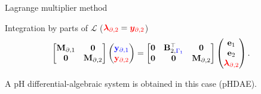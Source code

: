 \documentclass[aspectratio=169]{ISAE-Beamer}
\begin{document}
\begin{frame}{Lagrange multiplier method}
{\begin{block}{Integration by parts of $\mathcal{L}$ ($\textcolor{red}{\bm{\lambda}_{\partial, 2}} = \textcolor{red}{\bm{y}_{\partial, 2}}$)}
\begin{equation*}
\begin{aligned}
					\begin{bmatrix}
						\mathbf{M}_{\partial, 1} & \mathbf{0} \\
						\mathbf{0} & \mathbf{M}_{\partial, 2} \\
					\end{bmatrix}
					\begin{pmatrix}
						\textcolor{blue}{\mathbf{y}_{\partial, 1}} \\
						\textcolor{red}{\mathbf{y}_{\partial, 2}} \\
					\end{pmatrix}
					&= \begin{bmatrix}
						\mathbf{0} & \mathbf{B}_{2, \textcolor{blue}{\Gamma_1}}^\top & \mathbf{0} \\
						\mathbf{0} & \mathbf{0} & \mathbf{M}_{\partial, 2} \\
					\end{bmatrix}\begin{pmatrix}
						\mathbf{e}_{1} \\
						\mathbf{e}_{2} \\
						\textcolor{red}{\bm{\lambda}_{\partial, 2}} \\
					\end{pmatrix}.
				\end{aligned}
			\end{equation*}
		\end{block}
	}
	A pH differential-algebraic system is obtained in this case (pHDAE).
\end{frame}
\end{document}
